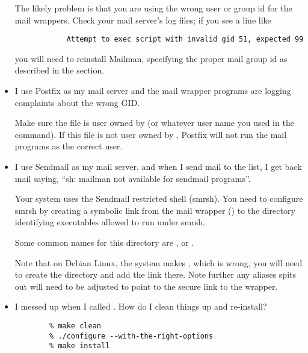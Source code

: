 \documentclass{howto}
\begin{document}
\begin{itemize}
       The likely problem is that you are using the wrong
      user or group id for the mail wrappers.  Check your mail server's log
      files; if you see a line like

      \begin{verbatim}
            Attempt to exec script with invalid gid 51, expected 99
      \end{verbatim}

      you will need to reinstall Mailman, specifying the proper mail group id
      as described in the \label{building} section.

\item {} I use Postfix as my mail server and the mail wrapper
      programs are logging complaints about the wrong GID.

       Make sure the 
      file is user owned by  (or whatever user name you used
      in the  command).  If this file is not user owned by
      , Postfix will not run the mail programs as the correct
      user.

\item {} I use Sendmail as my mail server, and when I send mail
      to the list, I get back mail saying, ``sh: mailman not available for
      sendmail programs''.

       Your system uses the Sendmail restricted shell
      (smrsh). You need to configure smrsh by creating a symbolic link from
      the mail wrapper () to the directory
      identifying executables allowed to run under smrsh.

      Some common names for this directory are ,
       or .

      Note that on Debian Linux, the system makes ,
      which is wrong, you will need to create the directory
       and add the link there.  Note further any
      aliases  spits out will need to be adjusted to point
      to the secure link to the wrapper.

\item {}  I messed up when I called .  How
      do I clean things up and re-install?


      \begin{verbatim}
        % make clean
        % ./configure --with-the-right-options
        % make install
      \end{verbatim}

\end{itemize}
\end{document}
